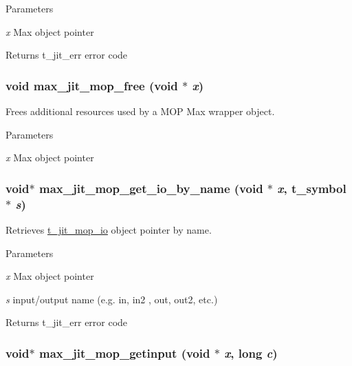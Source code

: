 \begin{DoxyParams}{Parameters}
\item[{\em x}]Max object pointer\end{DoxyParams}
\begin{DoxyReturn}{Returns}
t\_\-jit\_\-err error code 
\end{DoxyReturn}
\hypertarget{group__maxmopmod_ga441ff70d705e1eccff8297437c85e46c}{
\subsubsection[{max\_\-jit\_\-mop\_\-free}]{\setlength{\rightskip}{0pt plus 5cm}void max\_\-jit\_\-mop\_\-free (void $\ast$ {\em x})}}
\label{group__maxmopmod_ga441ff70d705e1eccff8297437c85e46c}


Frees additional resources used by a MOP Max wrapper object. 
\begin{DoxyParams}{Parameters}
\item[{\em x}]Max object pointer \end{DoxyParams}
\hypertarget{group__maxmopmod_gac9b7b486107f75f0d01fe82b34a5a6ea}{
\subsubsection[{max\_\-jit\_\-mop\_\-get\_\-io\_\-by\_\-name}]{\setlength{\rightskip}{0pt plus 5cm}void$\ast$ max\_\-jit\_\-mop\_\-get\_\-io\_\-by\_\-name (void $\ast$ {\em x}, \/  {\bf t\_\-symbol} $\ast$ {\em s})}}
\label{group__maxmopmod_gac9b7b486107f75f0d01fe82b34a5a6ea}


Retrieves \hyperlink{structt__jit__mop__io}{t\_\-jit\_\-mop\_\-io} object pointer by name. 
\begin{DoxyParams}{Parameters}
\item[{\em x}]Max object pointer \item[{\em s}]input/output name (e.g. in, in2 , out, out2, etc.)\end{DoxyParams}
\begin{DoxyReturn}{Returns}
t\_\-jit\_\-err error code 
\end{DoxyReturn}
\hypertarget{group__maxmopmod_ga92d7b66952db7f2b4045cfa51924c69d}{
\subsubsection[{max\_\-jit\_\-mop\_\-getinput}]{\setlength{\rightskip}{0pt plus 5cm}void$\ast$ max\_\-jit\_\-mop\_\-getinput (void $\ast$ {\em x}, \/  long {\em c})}}
\label{group__maxmopmod_ga92d7b66952db7f2b4045cfa51924c69d}


